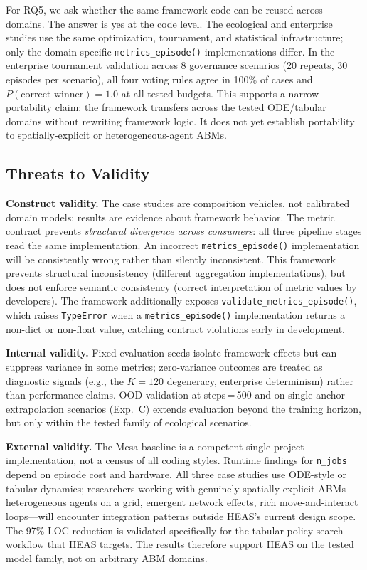 \documentclass{wscpaperproc}
\begin{document}
For RQ5, we ask whether the same framework code can be reused
across domains. The answer is yes at the code level. The ecological and
enterprise studies use the same optimization, tournament, and statistical
infrastructure; only the domain-specific \texttt{metrics\_episode()}
implementations differ. In the enterprise tournament validation across 8
governance scenarios (20 repeats, 30 episodes per scenario), all four voting
rules agree in 100\% of cases and $P(\text{correct winner})\!=\!1.0$ at all
tested budgets. This supports a narrow portability claim: the framework
transfers across the tested ODE/tabular domains without rewriting framework
logic. It does not yet establish portability to spatially-explicit or
heterogeneous-agent ABMs.

\subsection{Threats to Validity}

\textbf{Construct validity.} The case studies are composition vehicles, not
calibrated domain models; results are evidence about framework behavior. The
metric contract prevents \emph{structural divergence across consumers}: all
three pipeline stages read the same implementation. An incorrect \texttt{metrics\_episode()}
implementation will be consistently wrong rather than silently inconsistent. This framework prevents structural inconsistency (different aggregation implementations), but does not enforce semantic consistency (correct interpretation of metric values by developers). The
framework additionally exposes \texttt{validate\_metrics\_episode()}, which raises
\texttt{TypeError} when a \texttt{metrics\_episode()} implementation returns a
non-dict or non-float value, catching contract violations early in development.

\textbf{Internal validity.} Fixed evaluation seeds isolate framework effects
but can suppress variance in some metrics; zero-variance outcomes are treated as
diagnostic signals (e.g., the $K\!=\!120$ degeneracy, enterprise determinism)
rather than performance claims. OOD validation at steps\,=\,500 and on
single-anchor extrapolation scenarios (Exp.~C) extends evaluation beyond the
training horizon, but only within the tested family of ecological scenarios.

\textbf{External validity.} The Mesa baseline is a competent single-project
implementation, not a census of all coding styles. Runtime findings for
\texttt{n\_jobs} depend on episode cost and hardware. All three case studies
use ODE-style or tabular dynamics; researchers working with genuinely
spatially-explicit ABMs---heterogeneous agents on a grid, emergent network
effects, rich move-and-interact loops---will encounter integration patterns
outside HEAS's current design scope. The 97\% LOC reduction is validated
specifically for the tabular policy-search workflow that HEAS targets. The
results therefore support HEAS on the tested model family, not on arbitrary ABM
domains.
\end{document}
